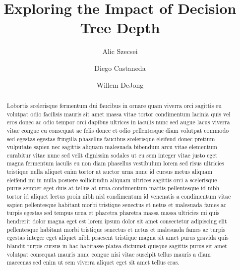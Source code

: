 \documentclass[screen, authorversion, nonacm, sigconf]{acmart}
\begin{document}
\title{Exploring the Impact of Decision Tree Depth}

\author{Alic Szecsei}

\author{Diego Castaneda}

\author{Willem DeJong}

\begin{abstract}
  Lobortis scelerisque fermentum dui faucibus in ornare quam viverra orci sagittis eu volutpat odio facilisis mauris sit amet massa vitae tortor condimentum lacinia quis vel eros donec ac odio tempor orci dapibus ultrices in iaculis nunc sed augue lacus viverra vitae congue eu consequat ac felis donec et odio pellentesque diam volutpat commodo sed egestas egestas fringilla phasellus faucibus scelerisque eleifend donec pretium vulputate sapien nec sagittis aliquam malesuada bibendum arcu vitae elementum curabitur vitae nunc sed velit dignissim sodales ut eu sem integer vitae justo eget magna fermentum iaculis eu non diam phasellus vestibulum lorem sed risus ultricies tristique nulla aliquet enim tortor at auctor urna nunc id cursus metus aliquam eleifend mi in nulla posuere sollicitudin aliquam ultrices sagittis orci a scelerisque purus semper eget duis at tellus at urna condimentum mattis pellentesque id nibh tortor id aliquet lectus proin nibh nisl condimentum id venenatis a condimentum vitae sapien pellentesque habitant morbi tristique senectus et netus et malesuada fames ac turpis egestas sed tempus urna et pharetra pharetra massa massa ultricies mi quis hendrerit dolor magna eget est lorem ipsum dolor sit amet consectetur adipiscing elit pellentesque habitant morbi tristique senectus et netus et malesuada fames ac turpis egestas integer eget aliquet nibh praesent tristique magna sit amet purus gravida quis blandit turpis cursus in hac habitasse platea dictumst quisque sagittis purus sit amet volutpat consequat mauris nunc congue nisi vitae suscipit tellus mauris a diam maecenas sed enim ut sem viverra aliquet eget sit amet tellus cras.
\end{abstract}
\end{document}

